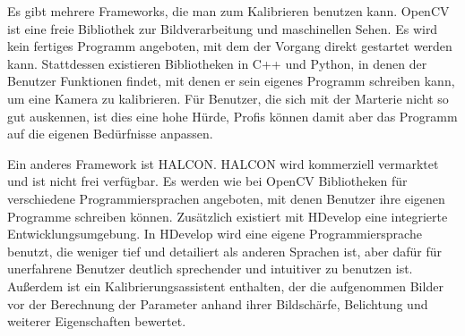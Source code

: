 Es gibt mehrere Frameworks, die man zum Kalibrieren benutzen kann. OpenCV ist eine freie Bibliothek zur Bildverarbeitung und maschinellen Sehen. Es wird kein fertiges Programm angeboten, mit dem der Vorgang direkt gestartet werden kann. Stattdessen existieren Bibliotheken in C++ und Python, in denen der Benutzer Funktionen findet, mit denen er sein eigenes Programm schreiben kann, um eine Kamera zu kalibrieren. Für Benutzer, die sich mit der Marterie nicht so gut auskennen, ist dies eine hohe Hürde, Profis können damit aber das Programm auf die eigenen Bedürfnisse anpassen.

Ein anderes Framework ist HALCON. HALCON wird kommerziell vermarktet und ist nicht frei verfügbar. Es werden wie bei OpenCV Bibliotheken für verschiedene Programmiersprachen angeboten, mit denen Benutzer ihre eigenen Programme schreiben können. Zusätzlich existiert mit HDevelop eine integrierte Entwicklungsumgebung. In HDevelop wird eine eigene Programmiersprache benutzt, die weniger tief und detailiert als anderen Sprachen ist, aber dafür für unerfahrene Benutzer deutlich sprechender und intuitiver zu benutzen ist. Außerdem ist ein Kalibrierungsassistent enthalten, der die aufgenommen Bilder vor der Berechnung der Parameter anhand ihrer Bildschärfe, Belichtung und weiterer Eigenschaften bewertet.